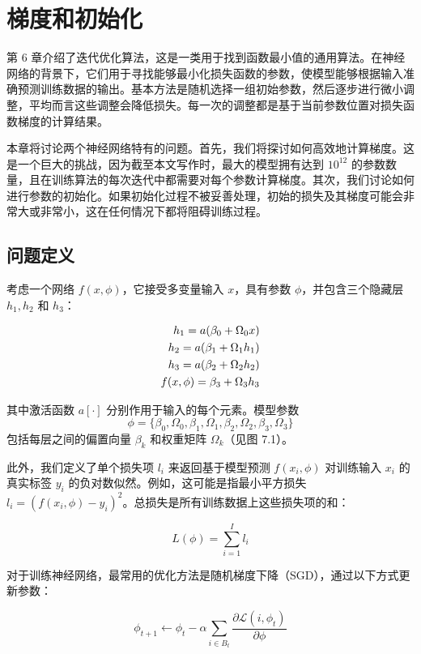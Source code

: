 \chapter{梯度和初始化}
第 6 章介绍了迭代优化算法，这是一类用于找到函数最小值的通用算法。在神经网络的背景下，它们用于寻找能够最小化损失函数的参数，使模型能够根据输入准确预测训练数据的输出。基本方法是随机选择一组初始参数，然后逐步进行微小调整，平均而言这些调整会降低损失。每一次的调整都是基于当前参数位置对损失函数梯度的计算结果。

本章将讨论两个神经网络特有的问题。首先，我们将探讨如何高效地计算梯度。这是一个巨大的挑战，因为截至本文写作时，最大的模型拥有达到 $10^12$ 的参数数量，且在训练算法的每次迭代中都需要对每个参数计算梯度。其次，我们讨论如何进行参数的初始化。如果初始化过程不被妥善处理，初始的损失及其梯度可能会非常大或非常小，这在任何情况下都将阻碍训练过程。
\section{问题定义}
考虑一个网络 \(f(x, \phi)\)，它接受多变量输入 \(x\)，具有参数 \(\phi\)，并包含三个隐藏层 \(h_1, h_2\) 和 \(h_3\)：


\begin{align}
h_1 = a(\beta_0 + \Omega_0x) \notag \\
h_2 = a(\beta_1 + \Omega_1h_1) \notag \\
h_3 = a(\beta_2 + \Omega_2h_2) \notag \\
f(x, \phi) = \beta_3 + \Omega_3h_3 
\end{align} 


其中激活函数 \(a[\cdot]\) 分别作用于输入的每个元素。模型参数 
\begin{equation*}
\phi = \{\beta_0,\Omega_0,\beta_1,\Omega_1,\beta_2,\Omega_2,\beta_3,\Omega_3\}    
\end{equation*}
包括每层之间的偏置向量 \(\beta_k\) 和权重矩阵 \(\Omega_k\)（见图 7.1）。


此外，我们定义了单个损失项 \(l_i\) 来返回基于模型预测 \(f(x_i, \phi)\) 对训练输入 \(x_i\) 的真实标签 \(y_i\) 的负对数似然。例如，这可能是指最小平方损失 \(l_i = (f(x_i, \phi) - y_i)^2\)。总损失是所有训练数据上这些损失项的和：

\begin{equation}
L(\phi) = \sum_{i=1}^{I} l_i 
\end{equation}

对于训练神经网络，最常用的优化方法是随机梯度下降（SGD），通过以下方式更新参数：

\begin{equation}
\phi_{t+1} \leftarrow \phi_t - \alpha \sum_{i \in B_t} \frac{\partial \mathcal{L}(i,\phi_t)}{\partial \phi} 
\end{equation}


